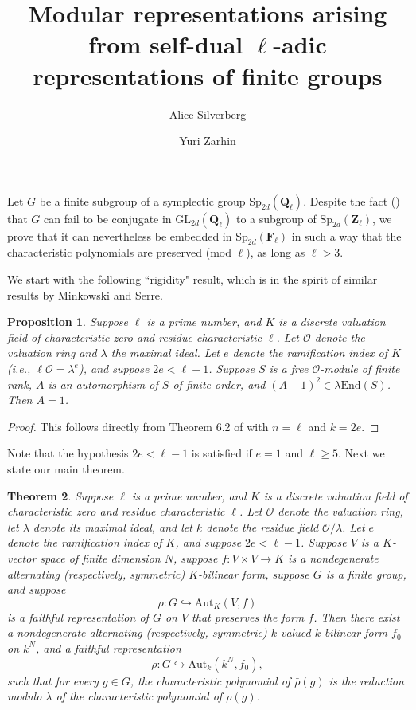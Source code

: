 \documentclass{amsart}
\title[Representations of finite groups]
{Modular representations arising from self-dual $\ell$-adic
         representations of finite groups}
\author[A.\ Silverberg]{Alice Silverberg}
\author[Yu. G. Zarhin]{Yuri Zarhin}
\def\Q{{\mathbf Q}}
\def\Z{{\mathbf Z}}
\def\F{{\mathbf F}}
\def\f{{\tilde F}}
\def\End{\mathrm{End}}
\def\Aut{\mathrm{Aut}}
\def\GL{\mathrm{GL}}
\def\Sp{\mathrm{Sp}}
\def\f{f}
\def\O{{\mathcal O}}
\newtheorem{thm}{Theorem}
\newtheorem{prop}[thm]{Proposition}
\theoremstyle{definition}
\begin{document}
\maketitle

Let $G$ be a finite subgroup of a symplectic group 
$\Sp_{2d}(\Q_\ell)$.
Despite the fact (\cite{symplectic}) 
that $G$ can fail to be conjugate
in $\GL_{2d}(\Q_\ell)$ to a subgroup of $\Sp_{2d}(\Z_\ell)$,
we prove that it can nevertheless be embedded in $\Sp_{2d}(\F_\ell)$
in such a way that the characteristic polynomials are preserved
(mod $\ell$), as long as $\ell>3$.

We start with the following ``rigidity" result,
which is in the spirit of similar results by Minkowski and Serre.

\begin{prop}
\label{minkthm}
Suppose $\ell$ is a prime number, and
$K$ is a discrete valuation field of characteristic zero
and residue characteristic $\ell$.
Let $\O$ denote the valuation ring and $\lambda$ the maximal
ideal. Let $e$ denote the ramification index of $K$ (i.e.,
$\ell\O=\lambda^e$), and suppose $2e<\ell-1$.
Suppose $S$ is a free $\O$-module of finite rank, $A$ is an
automorphism of $S$ of finite 
order, and $(A-1)^2\in\lambda\End(S)$.
Then $A=1$.
\end{prop}

\begin{proof}
This follows directly from Theorem 6.2 of \cite{Mink} with
$n=\ell$ and $k=2e$.
\end{proof}

Note that the hypothesis $2e<\ell-1$ is satisfied if
$e=1$ and $\ell \ge 5$. Next we state our main theorem. 

\begin{thm}
\label{mainthm}
Suppose 
$\ell$ is a prime number, and $K$ is a discrete valuation field 
of characteristic zero and residue characteristic $\ell$.
Let $\O$ denote the valuation ring, let $\lambda$ denote its maximal
ideal, and let $k$ denote the residue field $\O/\lambda$.
Let $e$ denote the ramification index of $K$, and 
suppose $2e<\ell-1$.
Suppose $V$ is a $K$-vector space of finite dimension $N$, 
suppose $\f:V \times V \to K$ 
is a nondegenerate alternating (respectively, symmetric) 
$K$-bilinear form, 
suppose $G$ is a finite group, and suppose 
$$\rho : G \hookrightarrow \Aut_K(V,{\f})$$
is a faithful representation of $G$ on $V$ that preserves
the form $f$.
Then there exist a nondegenerate alternating 
(respectively, symmetric) 
$k$-valued 
$k$-bilinear form 
${\f}_0$ on $k^N$, 
and a faithful representation
$${\bar \rho} : G \hookrightarrow \Aut_k(k^N,{\f}_0),$$
such that for every $g \in G$, the characteristic
polynomial of ${\bar \rho}(g)$ is the reduction modulo
$\lambda$ of the characteristic polynomial of $\rho(g)$.
\end{thm}
\end{document}
